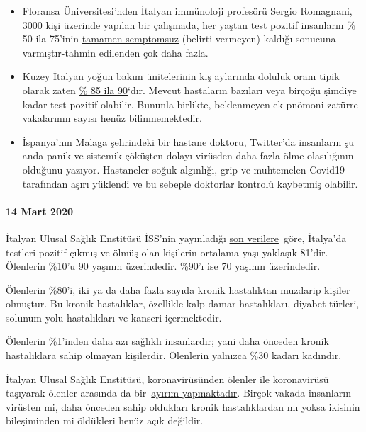 \begin{itemize}
\tightlist
\item
  Floransa Üniversitesi'nden İtalyan immünoloji profesörü Sergio
  Romagnani, 3000 kişi üzerinde yapılan bir çalışmada, her yaştan test
  pozitif insanların \% 50 ila 75'inin
  \href{https://www.repubblica.it/salute/medicina-e-ricerca/2020/03/16/news/coronavirus_studio_il_50-75_dei_casi_a_vo_sono_asintomatici_e_molto_contagiosi-251474302/}{tamamen
  semptomsuz} (belirti vermeyen) kaldığı sonucuna varmıştır-tahmin
  edilenden çok daha fazla.
\item
  Kuzey İtalyan yoğun bakım ünitelerinin kış aylarında doluluk oranı
  tipik olarak zaten
  \href{https://jamanetwork.com/journals/jama/fullarticle/2763188}{\% 85
  ila 90}`dır. Mevcut hastaların bazıları veya birçoğu şimdiye kadar
  test pozitif olabilir. Bununla birlikte, beklenmeyen ek
  pnömoni-zatürre vakalarının sayısı henüz bilinmemektedir.
\item
  İspanya'nın Malaga şehrindeki bir hastane doktoru,
  \href{https://twitter.com/NeurologaenSAS/status/1239498772570308609}{Twitter'da}
  insanların şu anda panik ve sistemik çöküşten dolayı virüsden daha
  fazla ölme olasılığının olduğunu yazıyor. Hastaneler soğuk algınlığı,
  grip ve muhtemelen Covid19 tarafından aşırı yüklendi ve bu sebeple
  doktorlar kontrolü kaybetmiş olabilir.
\end{itemize}

\hypertarget{14-mart-2020-}{%
\paragraph{14 Mart 2020 }\label{14-mart-2020-}}

İtalyan Ulusal Sağlık Enstitüsü İSS'nin yayınladığı
\href{https://www.epicentro.iss.it/coronavirus/sars-cov-2-decessi-italia}{son
verilere}~göre, İtalya'da testleri pozitif çıkmış ve ölmüş olan
kişilerin ortalama yaşı yaklaşık 81'dir. Ölenlerin \%10'u 90 yaşının
üzerindedir. \%90'ı ise 70 yaşının üzerindedir.

Ölenlerin \%80'i, iki ya da daha fazla sayıda kronik hastalıktan
muzdarip kişiler olmuştur. Bu kronik hastalıklar, özellikle kalp-damar
hastalıkları, diyabet türleri, solunum yolu hastalıkları ve kanseri
içermektedir.

Ölenlerin \%1'inden daha azı sağlıklı insanlardır; yani daha önceden
kronik hastalıklara sahip olmayan kişilerdir. Ölenlerin yalnızca \%30
kadarı kadındır.

İtalyan Ulusal Sağlık Enstitüsü, koronavirüsünden ölenler ile
koronavirüsü taşıyarak ölenler arasında da
bir~\href{https://youtu.be/0M4kbPDHGR0?t=210}{ayırım yapmaktadır}.
Birçok vakada insanların virüsten mi, daha önceden sahip oldukları
kronik hastalıklardan mı yoksa ikisinin bileşiminden mi öldükleri henüz
açık değildir.

